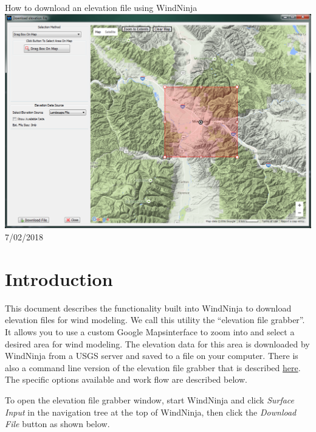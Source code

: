 \documentclass[12pt]{article}
\begin{document}
\begin{titlepage}
    \centering
    {\Huge
       How to download an elevation file using WindNinja
    }    
    \vfill
    \includegraphics[scale=0.75]{dem_download_0}
    \vfill
  	{\Huge
	  7/02/2018 %
  	}
    \vfill
\end{titlepage}


\section*{Introduction}
This document describes the functionality built into WindNinja to download
elevation files for wind modeling.  We call this utility the “elevation file
grabber”.  It allows you to use a custom Google Maps\texttrademark interface to zoom into
and select a desired area for wind modeling. The elevation data for this area
is downloaded by WindNinja from a USGS server and saved to a file on your
computer.  There is also a command line version of the elevation file grabber
that is described \href{http://firelab.github.io/windninja/pdf/fetch_dem_instructions.pdf}{here}.  The specific
options available and work flow are described below.

To open the elevation file grabber window, start WindNinja and click \textit{Surface Input} in the navigation tree at the top of WindNinja, then click the \textit{Download File} button as shown below.
\end{document}
